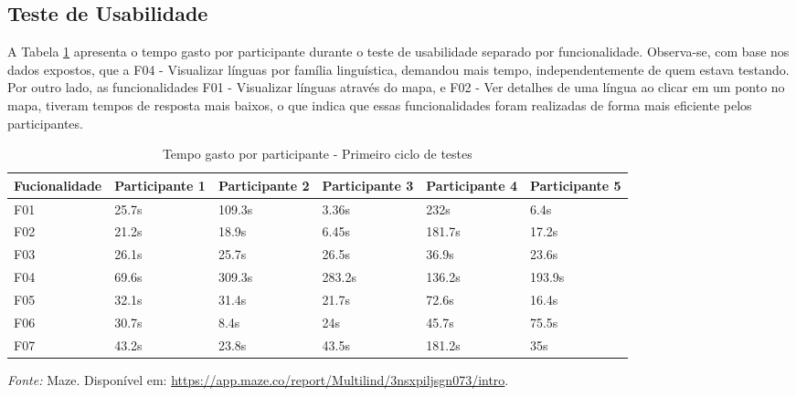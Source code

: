 \subsection{Teste de Usabilidade}
\label{sec:Teste de Usabilidade}
A Tabela \ref{tab06} apresenta o tempo gasto por participante durante o teste de usabilidade separado por funcionalidade. Observa-se, com base nos dados expostos, que a F04 - Visualizar línguas por família linguística, 
demandou mais tempo, independentemente de quem estava testando. Por outro lado, as funcionalidades F01 - Visualizar línguas através do mapa, e F02 - Ver detalhes de uma língua ao clicar em um ponto no mapa, tiveram tempos 
de resposta mais baixos, o que indica que essas funcionalidades foram realizadas de forma mais eficiente pelos participantes.

\begin{table}[h!]
	\centering
	\caption{Tempo gasto por participante - Primeiro ciclo de testes}
	\label{tab06}
	\begin{adjustbox}{center}
	\begin{tabular}{l|l|l|l|l|l}
	\hline
	Fucionalidade & Participante 1 & Participante 2 & Participante 3 & Participante 4 & Participante 5 \\ 	\hline
	F01                   & 25.7s     & 109.3s     & 3.36s      & 232s       & 6.4s      \\
	F02                   & 21.2s        & 18.9s      & 6.45s      & 181.7s    & 17.2s     \\
	F03                   & 26.1s        & 25.7s      & 26.5s      & 36.9s     & 23.6s     \\
	F04                   & 69.6s        & 309.3s     & 283.2s     & 136.2s     & 193.9s     \\
	F05                   & 32.1s      & 31.4s      & 21.7s     & 72.6s     & 16.4s     \\
	F06                   & 30.7s     & 8.4s      & 24s     & 45.7s     & 75.5s     \\
	F07                   & 43.2s     & 23.8s      & 43.5s     & 181.2s    & 35s      \\ 	\hline
	\end{tabular}
	\end{adjustbox}
	\begin{tablenotes}[flushleft]
		\centering
		\item \textit{Fonte:} Maze. Disponível em: \url{https://app.maze.co/report/Multilind/3nsxpiljsgn073/intro}.
	  \end{tablenotes}
\end{table}

